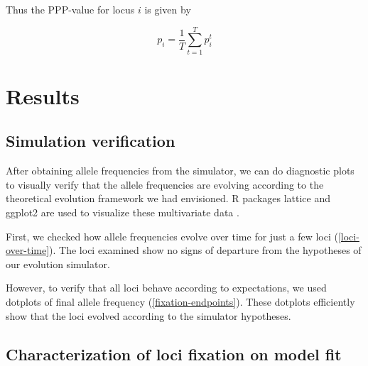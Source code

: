 \documentclass[a4paper,12pt]{article}
\begin{document}
Thus the PPP-value for locus $i$ is given by

$$
p_i = \frac 1 T \sum_{t=1}^T p_i^t
$$

\section{Results}

\subsection{Simulation verification}

After obtaining allele frequencies from the simulator, we can do
diagnostic plots to visually verify that the allele frequencies are
evolving according to the theoretical evolution framework we had
envisioned. R packages lattice and ggplot2 are used to visualize these
multivariate data \cite{lattice,ggplot2}.

First, we checked how allele frequencies evolve over time for just a
few loci (\autoref{loci-over-time}). The loci examined show no signs
of departure from the hypotheses of our evolution simulator.


However, to verify that all loci behave according to expectations, we
used dotplots of final allele frequency
(\autoref{fixation-endpoints}). These dotplots efficiently show that
the loci evolved according to the simulator hypotheses.


\subsection{Characterization of loci fixation on model fit}
\end{document}
